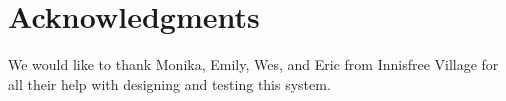 \documentclass{sig-alternate}
\begin{document}
\section{Acknowledgments}
We would like to thank Monika, Emily, Wes, and Eric from Innisfree Village for all their help with designing and testing this system.
 

%

%
%
\end{document}
